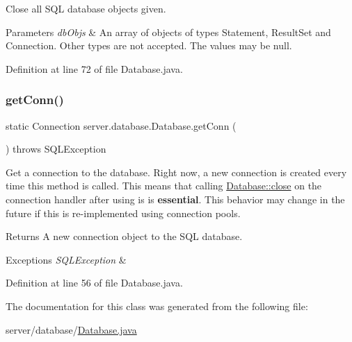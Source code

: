 Close all S\+QL database objects given. 
\begin{DoxyParams}{Parameters}
{\em db\+Objs} & An array of objects of types {\ttfamily Statement}, {\ttfamily Result\+Set} and {\ttfamily Connection}. Other types are not accepted. The values may be null. \\
\hline
\end{DoxyParams}


Definition at line 72 of file Database.\+java.

\hypertarget{classserver_1_1database_1_1_database_aba33cd2ea573a20b822bcd2a4dc749ea}{}\label{classserver_1_1database_1_1_database_aba33cd2ea573a20b822bcd2a4dc749ea} 
\subsubsection{\texorpdfstring{get\+Conn()}{getConn()}}
{\footnotesize\ttfamily static Connection server.\+database.\+Database.\+get\+Conn (\begin{DoxyParamCaption}{ }\end{DoxyParamCaption}) throws S\+Q\+L\+Exception\hspace{0.3cm}{\ttfamily [static]}}

Get a connection to the database. Right now, a new connection is created every time this method is called. This means that calling {\ttfamily \hyperlink{classserver_1_1database_1_1_database_ad186e6746e4dbc2ac8d21c8223fa63d0}{Database\+::close}} on the connection handler after using is is {\bfseries essential}. This behavior may change in the future if this is re-\/implemented using connection pools. \begin{DoxyReturn}{Returns}
A new connection object to the S\+QL database. 
\end{DoxyReturn}

\begin{DoxyExceptions}{Exceptions}
{\em S\+Q\+L\+Exception} & \\
\hline
\end{DoxyExceptions}


Definition at line 56 of file Database.\+java.



The documentation for this class was generated from the following file\+:\begin{DoxyCompactItemize}
\item 
server/database/\hyperlink{_database_8java}{Database.\+java}\end{DoxyCompactItemize}
